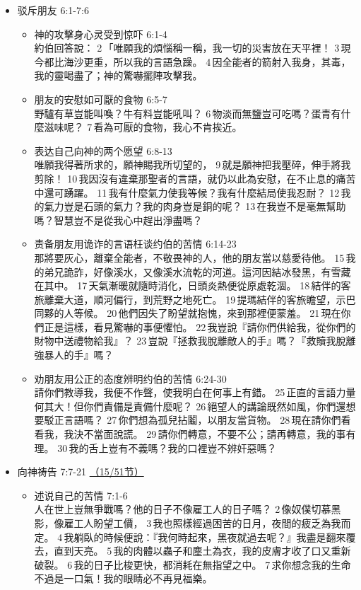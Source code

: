 \begin{itemize}
\itemsep-.45em 
\item 驳斥朋友 6:1-7:6
\begin{itemize}
\itemsep-.45em
\item 神的攻擊身心灵受到惊吓 6:1-4 \\
約伯回答說： 2 「唯願我的煩惱稱一稱，我一切的災害放在天平裡！ 3 現今都比海沙更重，所以我的言語急躁。 4 因全能者的箭射入我身，其毒，我的靈喝盡了；神的驚嚇擺陣攻擊我。
\item 朋友的安慰如可厭的食物 6:5-7\\
野驢有草豈能叫喚？牛有料豈能吼叫？ 6 物淡而無鹽豈可吃嗎？蛋青有什麼滋味呢？ 7 看為可厭的食物，我心不肯挨近。
\item 表达自己向神的两个愿望 6:8-13\\
唯願我得著所求的，願神賜我所切望的， 9 就是願神把我壓碎，伸手將我剪除！ 10 我因沒有違棄那聖者的言語，就仍以此為安慰，在不止息的痛苦中還可踴躍。 11 我有什麼氣力使我等候？我有什麼結局使我忍耐？ 12 我的氣力豈是石頭的氣力？我的肉身豈是銅的呢？ 13 在我豈不是毫無幫助嗎？智慧豈不是從我心中趕出淨盡嗎？
\item 责备朋友用诡诈的言语枉谈约伯的苦情 6:14-23\\
那將要灰心，離棄全能者，不敬畏神的人，他的朋友當以慈愛待他。 15 我的弟兄詭詐，好像溪水，又像溪水流乾的河道。這河因結冰發黑，有雪藏在其中。 17 天氣漸暖就隨時消化，日頭炎熱便從原處乾涸。 18 結伴的客旅離棄大道，順河偏行，到荒野之地死亡。 19 提瑪結伴的客旅瞻望，示巴同夥的人等候。 20 他們因失了盼望就抱愧，來到那裡便蒙羞。 21 現在你們正是這樣，看見驚嚇的事便懼怕。 22 我豈說『請你們供給我，從你們的財物中送禮物給我』？ 23 豈說『拯救我脫離敵人的手』嗎？『救贖我脫離強暴人的手』嗎？
\item 劝朋友用公正的态度辨明约伯的苦情 6:24-30\\
請你們教導我，我便不作聲，使我明白在何事上有錯。 25 正直的言語力量何其大！但你們責備是責備什麼呢？ 26 絕望人的講論既然如風，你們還想要駁正言語嗎？ 27 你們想為孤兒拈鬮，以朋友當貨物。 28 現在請你們看看我，我決不當面說謊。 29 請你們轉意，不要不公；請再轉意，我的事有理。 30 我的舌上豈有不義嗎？我的口裡豈不辨奸惡嗎？
\end{itemize}
\item 向神祷告 7:7-21 \underline{（15/51节）}
\begin{itemize}
\itemsep-.45em 
\item 述说自己的苦情 7:1-6\\
人在世上豈無爭戰嗎？他的日子不像雇工人的日子嗎？ 2 像奴僕切慕黑影，像雇工人盼望工價， 3 我也照樣經過困苦的日月，夜間的疲乏為我而定。 4 我躺臥的時候便說：『我何時起來，黑夜就過去呢？』我盡是翻來覆去，直到天亮。 5 我的肉體以蟲子和塵土為衣，我的皮膚才收了口又重新破裂。 6 我的日子比梭更快，都消耗在無指望之中。 7 求你想念我的生命不過是一口氣！我的眼睛必不再見福樂。

\end{itemize}
\end{itemize}
